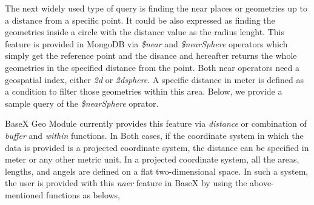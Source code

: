 \documentclass[a4paper,12pt]{article}
\begin{document}

The next widely used type of query is finding the near places or geometries up to a distance from a specific point. It could be also expressed as finding the geometries inside a circle with the distance value as the radius lenght. This feature is provided in MongoDB via \textit{\$near} and \textit{\$nearSphere} operators which simply get the reference point and the disance and hereafter returns the whole geometries in the specified distance from the point. Both near operators need a geospatial index, either \textit{2d} or \textit{2dsphere}. A specific distance in meter is defined as a condition to filter those geometries within this area. Below, we provide a sample query of the \textit{\$nearSphere} oprator.  
\vspace{10px}
\vspace{10px}
BaseX Geo Module currently provides this feature via \textit{distance} or combination of \textit{buffer} and \textit{within} functions. In Both cases, if the coordinate system in which the data is provided is a projected coordinate system, the distance can be specified in meter or any other metric unit. In a projected coordinate system, all the areas, lengths, and angels are defined on a flat two-dimensional space. In such a system, the user is provided with this \textit{naer} feature in BaseX by using the above-mentioned functions as belows,
\vspace{10px}
\vspace{10px}
\end{document}
